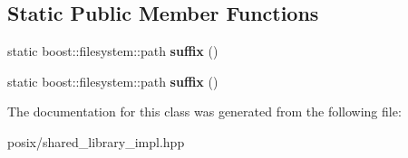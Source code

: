 \subsection*{Static Public Member Functions}
\begin{DoxyCompactItemize}
\item 
static boost\+::filesystem\+::path {\bfseries suffix} ()\hypertarget{a00272_a07728a8e1ad349b2fa59a12560583e25}{}\label{a00272_a07728a8e1ad349b2fa59a12560583e25}

\item 
static boost\+::filesystem\+::path {\bfseries suffix} ()\hypertarget{a00272_a07728a8e1ad349b2fa59a12560583e25}{}\label{a00272_a07728a8e1ad349b2fa59a12560583e25}

\end{DoxyCompactItemize}


The documentation for this class was generated from the following file\+:\begin{DoxyCompactItemize}
\item 
posix/shared\+\_\+library\+\_\+impl.\+hpp\end{DoxyCompactItemize}
